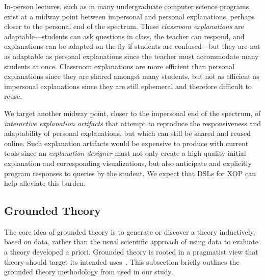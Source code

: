 \documentclass[sigconf]{acmart}
\begin{document}
In-person lectures, such as in many undergraduate computer science programs,
exist at a midway point between impersonal and personal explanations, perhaps
closer to the personal end of the spectrum. These \emph{classroom explanations}
are adaptable---students can ask questions in class, the teacher can respond,
and explanations can be adapted on the fly if students are confused---but they
are not as adaptable as personal explanations since the teacher must
accommodate many students at once. Classroom explanations are more efficient
than personal explanations since they are shared amongst many students, but not
as efficient as impersonal explanations since they are still ephemeral and
therefore difficult to reuse.


We target another midway point, closer to the impersonal end of the spectrum,
of \emph{interactive explanation artifacts} that attempt to reproduce the
responsiveness and adaptability of personal explanations, but which can still
be shared and reused online. Such explanation artifacts would be expensive to
produce with current tools since an \emph{explanation designer} must not only
create a high quality initial explanation and corresponding visualizations, but
also anticipate and explicitly program responses to queries by the student.
%
We expect that DSLs for XOP can help alleviate this burden.


\subsection{Grounded Theory}
\label{sec:back:gt}

The core idea of grounded theory is to generate or discover a theory
inductively, based on data, rather than the usual scientific approach of using
data to evaluate a theory developed a priori. 
%
Grounded theory is rooted in a pragmatist view that theory should target
its intended uses~\cite{Strauss67discoveryof}.
%
%
%
%
This subsection briefly outlines the grounded theory methodology from
\citet{corbin2014basics} used in our study.
\end{document}
